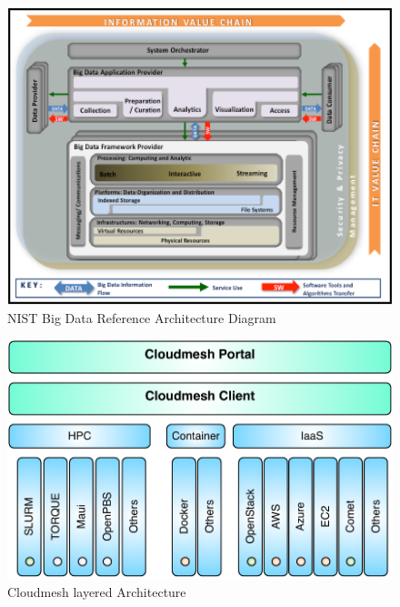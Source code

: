 \begin{figure}[htb]
  \centering
      \includegraphics[width=1.0\columnwidth]{images/nist.png}
  \caption{NIST Big Data Reference Architecture Diagram} 
  \label{F:NIST-arch}
\end{figure}


\begin{figure}[htb]
  \centering
      \includegraphics[width=1.0\columnwidth]{images/cloudmesh-arch-1.pdf}
  \caption{Cloudmesh layered Architecture} 
  \label{F:NIST-arch}
\end{figure}

